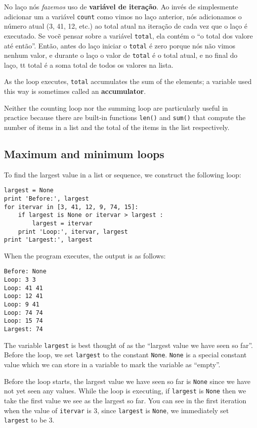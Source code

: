 No laço nós \emph{fazemos} uso de {\bf variável de iteração}. Ao invés de
simplesmente adicionar um a variável {\tt count} como vimos no laço anterior,
nós adicionamos o número atual (3, 41, 12, etc.) ao total atual na iteração
de cada vez que o laço é executado. Se vocẽ pensar sobre a variável
{\tt total}, ela contém o ``o total dos valore até então''. Então, antes do
laço iniciar o {\tt total} é zero porque nós não vimos nenhum valor, e durante
o laço o valor de {\tt total} é o total atual, e no final do laço, {tt total}
é a soma total de todos os valores na lista.

As the loop executes, {\tt total} accumulates the sum of the
elements; a variable used this way is sometimes called an
{\bf accumulator}.


Neither the counting loop nor the summing loop are particularly 
useful in practice because there are built-in functions 
{\tt len()} and {\tt sum()} that compute the number of 
items in a list and the total of the items in the list
respectively.

\subsection{Maximum and minimum loops}

\label{maximumloop}
To find the largest value in a list or sequence, we construct the
following loop:

\beforeverb
\begin{verbatim}
largest = None
print 'Before:', largest
for itervar in [3, 41, 12, 9, 74, 15]:
    if largest is None or itervar > largest :
        largest = itervar
    print 'Loop:', itervar, largest
print 'Largest:', largest
\end{verbatim}
\afterverb
%
When the program executes, the output is as follows:

\beforeverb
\begin{verbatim}
Before: None
Loop: 3 3
Loop: 41 41
Loop: 12 41
Loop: 9 41
Loop: 74 74
Loop: 15 74
Largest: 74
\end{verbatim}
\afterverb
%
The variable {\tt largest} is best thought of as 
the ``largest value we have seen so far''.
Before the loop, we set {\tt largest} to the constant {\tt None}.  
{\tt None} is a special constant value which we can 
store in a variable to mark 
the variable as ``empty''.  

Before the loop starts, the largest value we have seen so far 
is {\tt None} since we have not yet seen any values.  While the 
loop is executing, if {\tt largest} is {\tt None} then we take
the first value we see as the largest so far.   You can see in 
the first iteration when the value of {\tt itervar} is 3,
since {\tt largest} is {\tt None}, we immediately set 
{\tt largest} to be 3.

